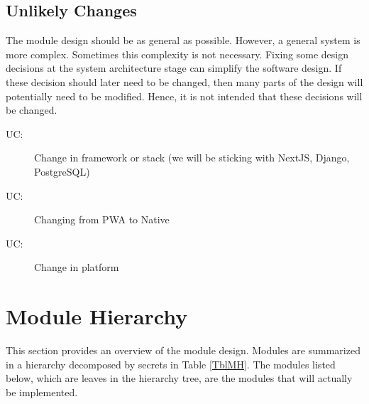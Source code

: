 \documentclass[12pt, titlepage]{article}
\newcounter{ucnum}
\newcommand{\uctheucnum}{UC\theucnum}
\begin{document}
\subsection{Unlikely Changes} \label{SecUchange}

The module design should be as general as possible. However, a general system is
more complex. Sometimes this complexity is not necessary. Fixing some design
decisions at the system architecture stage can simplify the software design. If
these decision should later need to be changed, then many parts of the design
will potentially need to be modified. Hence, it is not intended that these
decisions will be changed.

\begin{description}
\item[ \uctheucnum \label{ucIO}:] Change in framework or stack (we will be sticking with NextJS, Django, PostgreSQL)
\item[ \uctheucnum \label{ucIO}:] Changing from PWA to Native
\item[ \uctheucnum \label{ucIO}:] Change in platform
\end{description}

\section{Module Hierarchy} \label{SecMH}

This section provides an overview of the module design. Modules are summarized
in a hierarchy decomposed by secrets in Table \ref{TblMH}. The modules listed
below, which are leaves in the hierarchy tree, are the modules that will
actually be implemented.
\end{document}
